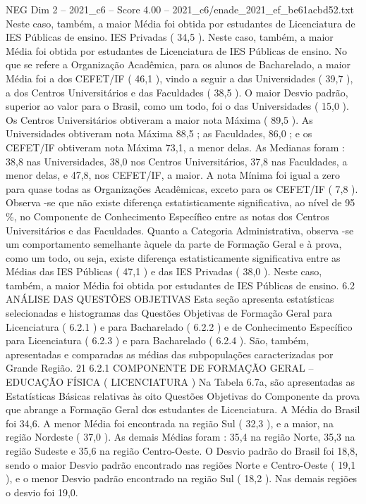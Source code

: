 \begin{textsample}{NEG Dim 2 – 2021\_c6 – Score 4.00 – 2021\_c6/enade\_2021\_ef\_be61acbd52.txt}
Neste caso, também, a maior Média foi obtida por estudantes de Licenciatura de IES Públicas de ensino.
IES Privadas ( 34,5 ).
Neste caso, também, a maior Média foi obtida por estudantes de Licenciatura de IES Públicas de ensino.
No que se refere a Organização Acadêmica, para os alunos de Bacharelado, a maior Média foi a dos CEFET/IF ( 46,1 ), vindo a seguir a das Universidades ( 39,7 ), a dos Centros Universitários e das Faculdades ( 38,5 ).
O maior Desvio padrão, superior ao valor para o Brasil, como um todo, foi o das Universidades ( 15,0 ).
Os Centros Universitários obtiveram a maior nota Máxima ( 89,5 ).
As Universidades obtiveram nota Máxima 88,5 ; as Faculdades, 86,0 ; e os CEFET/IF obtiveram nota Máxima 73,1, a menor delas.
As Medianas foram : 38,8 nas Universidades, 38,0 nos Centros Universitários, 37,8 nas Faculdades, a menor delas, e 47,8, nos CEFET/IF, a maior.
A nota Mínima foi igual a zero para quase todas as Organizações Acadêmicas, exceto para os CEFET/IF ( 7,8 ).
Observa -se que não existe diferença estatisticamente significativa, ao nível de 95 \%, no Componente de Conhecimento Específico entre as notas dos Centros Universitários e das Faculdades.
Quanto a Categoria Administrativa, observa -se um comportamento semelhante àquele da parte de Formação Geral e à prova, como um todo, ou seja, existe diferença estatisticamente significativa entre as Médias das IES Públicas ( 47,1 ) e das IES Privadas ( 38,0 ).
Neste caso, também, a maior Média foi obtida por estudantes de IES Públicas de ensino. 6.2 ANÁLISE DAS QUESTÕES OBJETIVAS Esta seção apresenta estatísticas selecionadas e histogramas das Questões Objetivas de Formação Geral para Licenciatura ( 6.2.1 ) e para Bacharelado ( 6.2.2 ) e de Conhecimento Específico para Licenciatura ( 6.2.3 ) e para Bacharelado ( 6.2.4 ).
São, também, apresentadas e comparadas as médias das subpopulações caracterizadas por Grande Região. 21 6.2.1 COMPONENTE DE FORMAÇÃO GERAL – EDUCAÇÃO FÍSICA ( LICENCIATURA ) Na Tabela 6.7a, são apresentadas as Estatísticas Básicas relativas às oito Questões Objetivas do Componente da prova que abrange a Formação Geral dos estudantes de Licenciatura.
A Média do Brasil foi 34,6.
A menor Média foi encontrada na região Sul ( 32,3 ), e a maior, na região Nordeste ( 37,0 ).
As demais Médias foram : 35,4 na região Norte, 35,3 na região Sudeste e 35,6 na região Centro-Oeste.
O Desvio padrão do Brasil foi 18,8, sendo o maior Desvio padrão encontrado nas regiões Norte e Centro-Oeste ( 19,1 ), e o menor Desvio padrão encontrado na região Sul ( 18,2 ).
Nas demais regiões o desvio foi 19,0.

\end{textsample}
